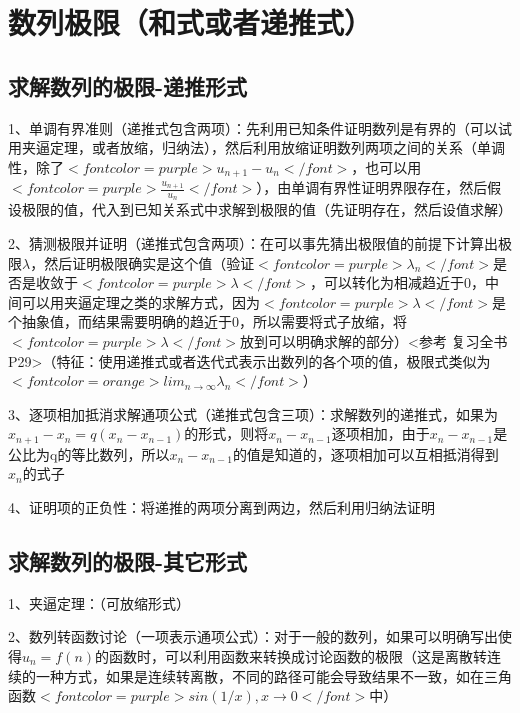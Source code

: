 \section{数列极限（和式或者递推式）}



\subsection{求解数列的极限-递推形式}

1、单调有界准则（递推式包含两项）：先利用已知条件证明数列是有界的（可以试用夹逼定理，或者放缩，归纳法），然后利用放缩证明数列两项之间的关系（单调性，除了$ <font color=purple>u_{n+1}-u_{n}</font> $，也可以用$ <font color=purple>\frac{u_{n+1}}{u_{n}}</font> $），由单调有界性证明界限存在，然后假设极限的值，代入到已知关系式中求解到极限的值（先证明存在，然后设值求解）

2、猜测极限并证明（递推式包含两项）：在可以事先猜出极限值的前提下计算出极限$ \lambda $，然后证明极限确实是这个值（验证$ <font color=purple>\lambda_n</font> $是否是收敛于$ <font color=purple>\lambda</font> $，可以转化为相减趋近于0，中间可以用夹逼定理之类的求解方式，因为$ <font color=purple>\lambda</font> $是个抽象值，而结果需要明确的趋近于0，所以需要将式子放缩，将$ <font color=purple>\lambda</font> $放到可以明确求解的部分）<参考 复习全书 P29>（特征：使用递推式或者迭代式表示出数列的各个项的值，极限式类似为$ <font color=orange>lim_{n \rightarrow \infty}\lambda_n</font> $）

3、逐项相加抵消求解通项公式（递推式包含三项）：求解数列的递推式，如果为$ x_{n+1}-x_{n}=q(x_{n}-x_{n-1}) $的形式，则将$ x_{n}-x_{n-1} $逐项相加，由于$ x_{n}-x_{n-1} $是公比为q的等比数列，所以$ x_{n}-x_{n-1} $的值是知道的，逐项相加可以互相抵消得到$ x_{n} $的式子

4、证明项的正负性：将递推的两项分离到两边，然后利用归纳法证明



\subsection{求解数列的极限-其它形式}

1、夹逼定理：（可放缩形式）

2、数列转函数讨论（一项表示通项公式）：对于一般的数列，如果可以明确写出使得$ u_{n}=f(n) $的函数时，可以利用函数来转换成讨论函数的极限（这是离散转连续的一种方式，如果是连续转离散，不同的路径可能会导致结果不一致，如在三角函数$ <font color=purple>sin(1/x),x \rightarrow 0</font> $中）



